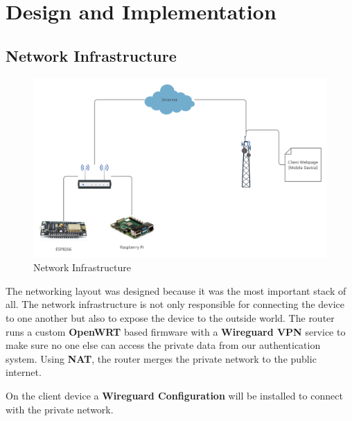 \chapter{Design and Implementation}
\label{chap:Design}

\section{Network Infrastructure}
    \begin{figure}[H]
        \centering
        \includegraphics[width=14cm]{images/network.png}
        \caption{Network Infrastructure}
    \end{figure}
    \begin{flushleft}
        The networking layout was designed because it was the most important stack of all. The network infrastructure is not only 
        responsible for connecting the device to one another but also to expose the device to the outside world. The router runs a 
        custom \textbf{OpenWRT} based firmware with a \textbf{Wireguard VPN} service to make sure no one else can access the private
        data from our authentication system. Using \textbf{NAT}, the router merges the private network to the public internet.

        On the client device a \textbf{Wireguard Configuration} will be installed to connect with the private network.
    \end{flushleft}


